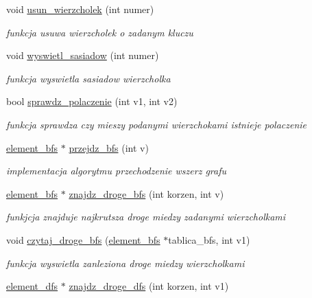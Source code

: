 \begin{DoxyCompactItemize}
void \hyperlink{classgraf_a369202eb63332e9faad779591c862ece}{usun\-\_\-wierzcholek} (int numer)
\begin{DoxyCompactList}\small\item\em funkcja usuwa wierzcholek o zadanym kluczu \end{DoxyCompactList}\item 
void \hyperlink{classgraf_a8dd83fa1722d917a143b2da9245b5db9}{wyswietl\-\_\-sasiadow} (int numer)
\begin{DoxyCompactList}\small\item\em funkcja wyswietla sasiadow wierzcholka \end{DoxyCompactList}\item 
bool \hyperlink{classgraf_ae1ebd85c7cb288174a5dccc5fd90634e}{sprawdz\-\_\-polaczenie} (int v1, int v2)
\begin{DoxyCompactList}\small\item\em funkcja sprawdza czy mieszy podanymi wierzchokami istnieje polaczenie \end{DoxyCompactList}\item 
\hyperlink{structelement__bfs}{element\-\_\-bfs} $\ast$ \hyperlink{classgraf_a83fde8c542586d92421c9870f07a0cc2}{przejdz\-\_\-bfs} (int v)
\begin{DoxyCompactList}\small\item\em implementacja algorytmu przechodzenie wszerz grafu \end{DoxyCompactList}\item 
\hyperlink{structelement__bfs}{element\-\_\-bfs} $\ast$ \hyperlink{classgraf_a420367f5ce066bd467c2621e3c69bdc3}{znajdz\-\_\-droge\-\_\-bfs} (int korzen, int v)
\begin{DoxyCompactList}\small\item\em funkjcja znajduje najkrutsza droge miedzy zadanymi wierzcholkami \end{DoxyCompactList}\item 
void \hyperlink{classgraf_a50eb021e0338d01d1f2a915f50add7c2}{czytaj\-\_\-droge\-\_\-bfs} (\hyperlink{structelement__bfs}{element\-\_\-bfs} $\ast$tablica\-\_\-bfs, int v1)
\begin{DoxyCompactList}\small\item\em funkcja wyswietla zanleziona droge miedzy wierzcholkami \end{DoxyCompactList}\item 
\hyperlink{structelement__dfs}{element\-\_\-dfs} $\ast$ \hyperlink{classgraf_a687140bdc84e60aa5f8342496bc2c06f}{znajdz\-\_\-droge\-\_\-dfs} (int korzen, int v1)

\end{DoxyCompactItemize}
